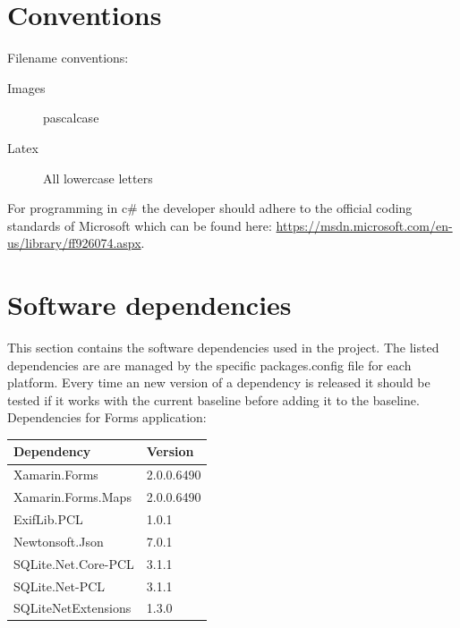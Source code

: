 \documentclass[12pt]{article}
\begin{document}
	\section{Conventions}

	Filename conventions:

	\begin{description}
		\item[Images] \gls{pascalcase}
		\item[Latex] All lowercase letters
	\end{description}

	For programming in c\# the developer should adhere to the official coding standards of Microsoft which can be found here: \url{https://msdn.microsoft.com/en-us/library/ff926074.aspx}.

	\section{Software dependencies}

	This section contains the software dependencies used in the project. The listed dependencies are are managed by the specific packages.config file for each platform. Every time an new version of a dependency is released it should be tested if it works with the current baseline before adding it to the baseline.
	\clearpage
	Dependencies for Forms application:
	\begin{table}[htbp]
		\begin{tabular}{ p{10cm}  p{2cm} }
			\textbf{Dependency} & \textbf{Version} \\ \hline
			Xamarin.Forms & 2.0.0.6490	 \\
			Xamarin.Forms.Maps & 2.0.0.6490	 \\
			ExifLib.PCL & 1.0.1 \\
			Newtonsoft.Json & 7.0.1 \\
			SQLite.Net.Core-PCL & 3.1.1 \\
			SQLite.Net-PCL & 3.1.1 \\
			SQLiteNetExtensions & 1.3.0
		\end{tabular}
	\end{table}
\end{document}
